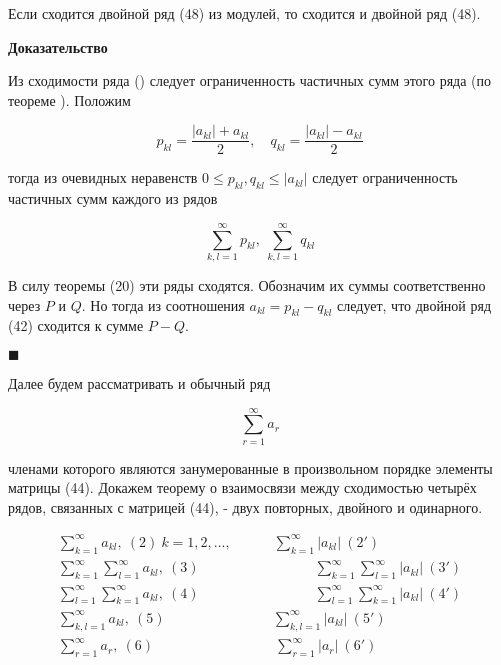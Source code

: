  \begin{theorem}
 	Если сходится двойной ряд (48) из модулей, то сходится и двойной ряд (48).
 \end{theorem}
 \textbf{Доказательство}
 
 Из сходимости ряда () следует ограниченность частичных сумм этого ряда (по теореме ). Положим
 
 \begin{equation*}
 	p_{kl} = \frac{|a_{kl}| + a_{kl}}{2},\quad q_{kl} = \frac{|a_{kl}| - a_{kl}}{2}
 \end{equation*}
 
 тогда из очевидных неравенств $0 \leqslant p_{kl}, q_{kl} \leqslant |a_{kl}|$ следует ограниченность частичных сумм каждого из рядов
 
 \begin{equation*}
 	\displaystyle\sum_{k,l = 1}^\infty p_{kl},\ \displaystyle\sum_{k,l = 1}^\infty q_{kl}
 \end{equation*}
 
 В силу теоремы (20) эти ряды сходятся. Обозначим их суммы соответственно через $P$ и $Q$. Но тогда из соотношения $a_{kl} = p_{kl} - q_{kl}$ следует, что двойной ряд (42) сходится к сумме $P - Q$.
 
 \begin{flushright}
 	$\blacksquare$
 \end{flushright}
 
 Далее будем рассматривать и обычный ряд
 
 \begin{equation}
 	\displaystyle\sum_{r = 1}^\infty a_r
 \end{equation}
 
 членами которого являются занумерованные в произвольном порядке элементы матрицы (44). Докажем теорему о взаимосвязи между сходимостью четырёх рядов, связанных с матрицей (44), - двух повторных, двойного и одинарного.
 
 \begin{equation*}
 	\begin{gathered}
 		\displaystyle\sum_{k = 1}^\infty a_{kl},\ (2)\ k = 1, 2, ..., \qquad \quad \displaystyle\sum_{k = 1}^\infty |a_{kl}| \ (2') \\
 		\displaystyle\sum_{k = 1}^\infty \displaystyle\sum_{l = 1}^\infty a_{kl}, \ (3) \qquad \qquad \qquad \qquad\ \displaystyle\sum_{k = 1}^\infty\displaystyle\sum_{l = 1}^\infty |a_{kl}| \ (3') \\
 		\displaystyle\sum_{l = 1}^\infty \displaystyle\sum_{k = 1}^\infty a_{kl}, \ (4) \qquad \qquad \qquad \qquad\ \displaystyle\sum_{l = 1}^\infty\displaystyle\sum_{k = 1}^\infty |a_{kl}| \ (4') \\
 		\displaystyle\sum_{k,l = 1}^\infty a_{kl},\ (5) \qquad \qquad \qquad \quad\ \ \ \displaystyle\sum_{k,l = 1}^\infty |a_{kl}| \ (5') \\
 		\displaystyle\sum_{r = 1}^\infty a_r, \ (6) \qquad \qquad \qquad \qquad\ \ \ \displaystyle\sum_{r = 1}^\infty |a_r|\ (6')
 	\end{gathered}
 \end{equation*}
 
